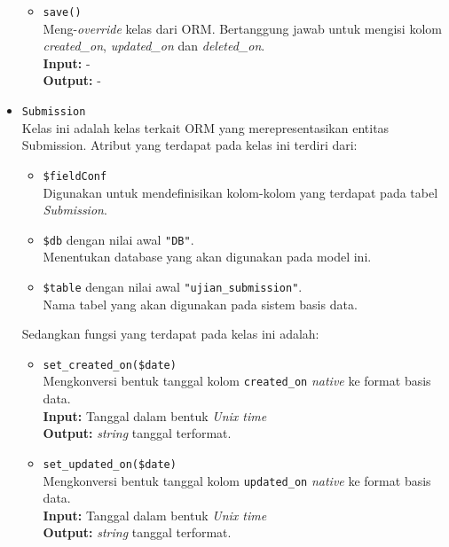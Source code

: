 \begin{itemize}
\begin{itemize}
                \item \texttt{save()}\\
                    Meng-\textit{override} kelas dari ORM. Bertanggung jawab
                    untuk mengisi kolom \textit{created\_on},
                    \textit{updated\_on} dan \textit{deleted\_on}.\\
                    \textbf{Input:} -\\
                    \textbf{Output:} -
            \end{itemize}
            
        \item \texttt{Submission} \\
            Kelas ini adalah kelas terkait ORM yang merepresentasikan entitas
            Submission. Atribut yang terdapat pada kelas ini terdiri dari:
            \begin{itemize}
                \item \texttt{\$fieldConf} \\
                    Digunakan untuk mendefinisikan kolom-kolom yang terdapat
                    pada tabel \textit{Submission}.
                \item \texttt{\$db} dengan nilai awal \texttt{"DB"}. \\
                    Menentukan database yang akan digunakan pada model ini.
                \item \texttt{\$table} dengan nilai awal
                \texttt{"ujian\_submission"}. \\
                    Nama tabel yang akan digunakan pada sistem basis data. 
            \end{itemize}
            Sedangkan fungsi yang terdapat pada kelas ini adalah:
            \begin{itemize}
                \item \texttt{set\_created\_on(\$date)} \\
                    Mengkonversi bentuk tanggal kolom \texttt{created\_on}
                    \textit{native} ke format basis data. \\
                    \textbf{Input:} Tanggal dalam bentuk \textit{Unix time}\\
                    \textbf{Output:} \textit{string} tanggal terformat.
                
                \item \texttt{set\_updated\_on(\$date)} \\
                    Mengkonversi bentuk tanggal kolom \texttt{updated\_on}
                    \textit{native} ke format basis data. \\
                    \textbf{Input:} Tanggal dalam bentuk \textit{Unix time}\\
                    \textbf{Output:} \textit{string} tanggal terformat.
                    

\end{itemize}
\end{itemize}
